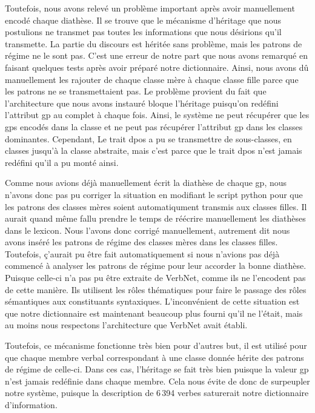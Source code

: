 {Toutefois, nous avons relevé un problème important après avoir manuellement encodé chaque diathèse. Il se trouve que le mécanisme d'héritage que nous postulions ne transmet pas toutes les informations que nous désirions qu'il transmette. La partie du discours est héritée sans problème, mais les patrons de régime ne le sont pas. C'est une erreur de notre part que nous avons remarqué en faisant quelques tests après avoir préparé notre dictionnaire. Ainsi, nous avons dû manuellement les rajouter de chaque classe mère à chaque classe fille parce que les patrons ne se transmettaient pas. Le problème provient du fait que l'architecture que nous avons instauré bloque l'héritage  puisqu'on redéfini l'attribut gp au complet à chaque fois. Ainsi, le système ne peut récupérer que les gps encodés dans la classe et ne peut pas récupérer l'attribut gp dans les classes dominantes. Cependant,  Le trait dpos a pu se transmettre de sous-classes, en classes jusqu'à la classe abstraite, mais c'est parce que le trait dpos n'est jamais redéfini qu'il a pu monté ainsi. 

Comme nous avions déjà manuellement écrit la diathèse de chaque \ac{gp}, nous n'avons donc pas pu corriger la situation en modifiant le script python pour que les patrons des classes mères soient automatiqument transmis aux classes filles. Il aurait quand même fallu prendre le temps de réécrire manuellement les diathèses dans le lexicon. Nous l'avons donc corrigé manuellement, autrement dit nous avons inséré les patrons de régime des classes mères dans les classes filles. Toutefois, ç'aurait pu être fait automatiquement si nous n'avions pas déjà commencé à analyser les patrons de régime pour leur accorder la bonne diathèse. Puisque celle-ci n'a pas pu être extraite de VerbNet, comme ils ne l'encodent pas de cette manière. Ils utilisent les rôles thématiques pour faire le passage des rôles sémantiques aux constituants syntaxiques. L'inconvénient de cette situation est que notre dictionnaire est maintenant beaucoup plus fourni qu'il ne l'était, mais au moins nous respectons l'architecture que VerbNet avait établi.

Toutefois, ce mécanisme fonctionne très bien pour d'autres but, il est utilisé pour que chaque membre verbal correspondant à une classe donnée hérite des patrons de régime de celle-ci. Dans ces cas, l'héritage se fait très bien puisque la valeur gp n'est jamais redéfinie dans chaque membre. Cela nous évite de donc de surpeupler notre système, puisque la description de 6\,394 verbes saturerait notre dictionnaire d'information.}

